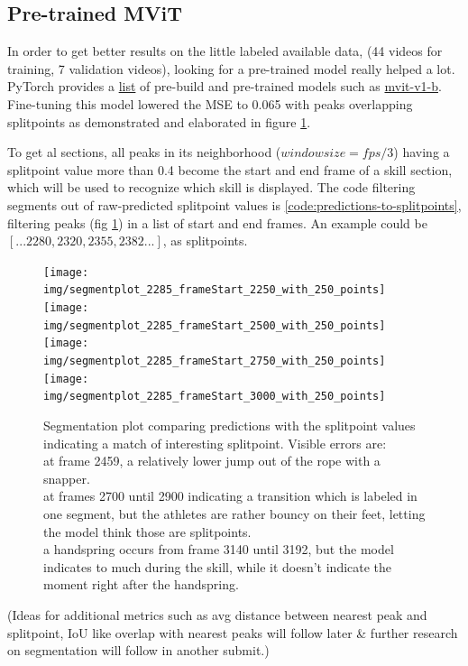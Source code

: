 \subsection{Pre-trained MViT}

In order to get better results on the little labeled available data, (44 videos for training, 7 validation videos), looking for a pre-trained model really helped a lot.
PyTorch provides a \href{https://pytorch.org/vision/main/models.html}{list} of pre-build and pre-trained models such as \href{https://pytorch.org/vision/main/models/video_mvit.html}{mvit-v1-b}.
Fine-tuning this model lowered the MSE to 0.065 with peaks overlapping splitpoints as demonstrated and elaborated in figure \ref{fig:segmentation-plot}.

To get al sections, all peaks in its neighborhood (\(windowsize = fps / 3\)) having a splitpoint value more than 0.4 become the start and end frame of a skill section, which will be used to recognize which skill is displayed. The code filtering segments out of raw-predicted splitpoint values is \ref{code:predictions-to-splitpoints}, filtering peaks (fig  \ref{fig:segmentation-plot}) in a list of start and end frames. An example could be \([...2280, 2320, 2355, 2382...]\), as splitpoints.


\begin{figure}
    \centering
    \texttt{[image: img/segmentplot\_2285\_frameStart\_2250\_with\_250\_points]}
    \texttt{[image: img/segmentplot\_2285\_frameStart\_2500\_with\_250\_points]}
    \texttt{[image: img/segmentplot\_2285\_frameStart\_2750\_with\_250\_points]}
    \texttt{[image: img/segmentplot\_2285\_frameStart\_3000\_with\_250\_points]}
    \caption[Segmentation plot]{Segmentation plot comparing predictions with the splitpoint values indicating a match of interesting splitpoint. Visible errors are: \\
        at frame 2459, a relatively lower jump out of the rope with a snapper. \\
        at frames 2700 until 2900 indicating a transition which is labeled in one segment, but the athletes are rather bouncy on their feet, letting the model think those are splitpoints. \\
        a handspring occurs from frame 3140 until 3192, but the model indicates to much during the skill, while it doesn't indicate the moment right after the handspring.
    }
    \label{fig:segmentation-plot}
\end{figure}

(Ideas for additional metrics such as avg distance between nearest peak and splitpoint, IoU like overlap with nearest peaks will follow later \& further research on segmentation will follow in another submit.)

